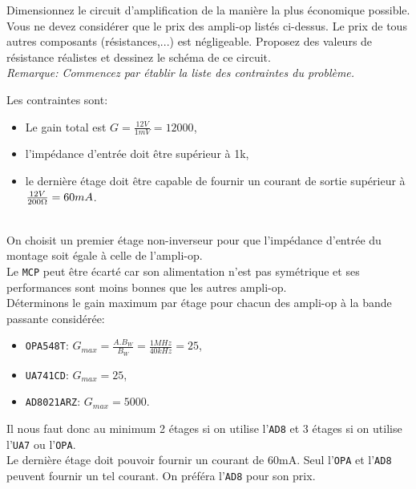 \documentclass{../template/tp}
\begin{document}
\Question
{
    Dimensionnez le circuit d'amplification de la manière la plus économique possible. 
    Vous ne devez considérer que le prix des ampli-op listés ci-dessus.
    Le prix de tous autres composants (résistances,...) est négligeable. 
    Proposez des valeurs de résistance réalistes et dessinez le schéma de ce circuit.\\
    \textit{Remarque: Commencez par établir la liste des contraintes du problème.}
}
{
    Les contraintes sont:
    \begin{itemize}
        \item Le gain total est $ G = \frac{\si{12}{V}}{\si{1}{mV}} = 12000 $,
        \item l'impédance d'entrée doit être supérieur à \si{1}{k\ohm},
        \item le dernière étage doit être capable de fournir un courant de sortie supérieur à 
            $ \frac{ \si{12}{V} }{ \si{200}{\ohm} } = \si{60}{mA} $.
    \end{itemize}
    ~\\

    On choisit un premier étage non-inverseur pour que l'impédance d'entrée du montage soit égale à celle de l'ampli-op.
    ~\\

    Le \texttt{MCP} peut être écarté car son alimentation n'est pas symétrique et ses performances sont moins bonnes que les autres ampli-op.
    ~\\
    
    Déterminons le gain maximum par étage pour chacun des ampli-op à la bande passante considérée:
    \begin{itemize}
        \item \texttt{OPA548T}: $ G_{max} = \frac{A.B_{W}}{B_{W}} =
            \frac{\si{1}{MHz}}{\si{40}{kHz}} = 25 $,
        \item \texttt{UA741CD}: $ G_{max} = 25 $,
        \item \texttt{AD8021ARZ}: $ G_{max} = 5000 $.
    \end{itemize}
    Il nous faut donc au minimum 2 étages si on utilise l'\texttt{AD8} et 3 étages si on utilise l'\texttt{UA7} ou l'\texttt{OPA}.
    ~\\
    
    Le dernière étage doit pouvoir fournir un courant de \si{60}{mA}.
    Seul l'\texttt{OPA} et l'\texttt{AD8} peuvent fournir un tel courant.
    On préféra l'\texttt{AD8} pour son prix.
    ~\\
    
}
\end{document}
